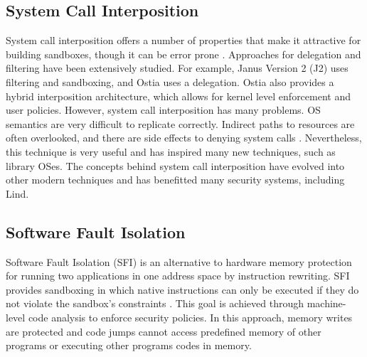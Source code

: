 \subsection{System Call Interposition}

System call interposition offers a number of properties that make it
attractive for building sandboxes, though it can be error prone
\cite{SCI-04}. Approaches for delegation and filtering have been
extensively studied. For example, 
Janus Version 2 (J2) \cite{Janus0:96, Janus:99} uses filtering and
sandboxing, and Ostia \cite{SCI-04} uses a delegation.
Ostia also provides a hybrid interposition architecture, which allows
for kernel level enforcement and user policies.
%
However, system call interposition has many problems.
OS semantics are very difficult to replicate correctly. Indirect paths
to resources are often overlooked,
and there are side effects to denying system calls
\cite{Problems-SCI}.
Nevertheless, this technique is very useful and has inspired many new
techniques, such as library OSes.
The concepts behind system call interposition have evolved into other
modern techniques
and has benefitted many security systems, including Lind. 

\subsection{Software Fault Isolation}
Software Fault Isolation (SFI) is an alternative to hardware memory
protection for running two applications in one address space by
instruction rewriting. SFI provides sandboxing in which native
instructions can only be executed if they do not violate the sandbox's
constraints \cite{SFI:93}. This goal is achieved through machine-level
code analysis to enforce security policies. In this approach, memory
writes are protected and code jumps cannot access predefined memory of
other programs or executing other programs codes in memory.


